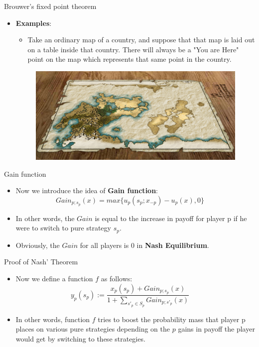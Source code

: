 \documentclass{beamer}
\begin{document}
\begin{frame}[fragile]{Brouwer’s fixed point theorem}
	\begin{itemize}
		\item \textbf{Examples}:
		\begin{itemize}
			\item Take an ordinary map of a country, and suppose that that map is laid out on a table inside that country. There will always be a "You are Here" point on the map which represents that same point in the country.
		\end{itemize}
		\begin{figure}[H]
			\centering
			\includegraphics[width=0.7\linewidth]{001.jpg}\vspace{-10pt}
			\nonumber\vspace{-10pt}
		\end{figure}
	\end{itemize}
\end{frame}

\begin{frame}[fragile]{Gain function}
	\begin{itemize}[<+->]
		\item Now we introduce the idea of \textbf{Gain function}:\\
		\begin{equation}
		Gain_{p;s_p} (x) = max\{u_p(s_p;x_{-p})-u_p(x), 0\} \ \  \ \ \ \ \ \nonumber
		\end{equation}
		\item In other words, the $Gain$ is equal to the increase in payoff for player p if he were to switch to pure
		strategy $s_p$.
		\item Obviously, the $Gain$ for all players is 0 in \textbf{Nash Equilibrium}.
	\end{itemize}
\end{frame}

\begin{frame}[fragile]{Proof of Nash' Theorem}
	\begin{itemize}[<+->]
		\item Now we define a function $f$ as follows:
		 \begin{equation}
		 y_p(s_p) := \frac{x_p(s_p) + Gain_{p;s_p}(x)}{1 + \sum_{s'_p \in S_p} Gain_{p;s'_p}(x)} \ \ \ \ \ \ \ \nonumber
		 \end{equation}
		\item In other words, function $f$ tries to boost the probability mass that player p places on various pure strategies
		depending on the $p$ gains in payoff the player would get by switching to these strategies.
	\end{itemize}
\end{frame}
\end{document}
